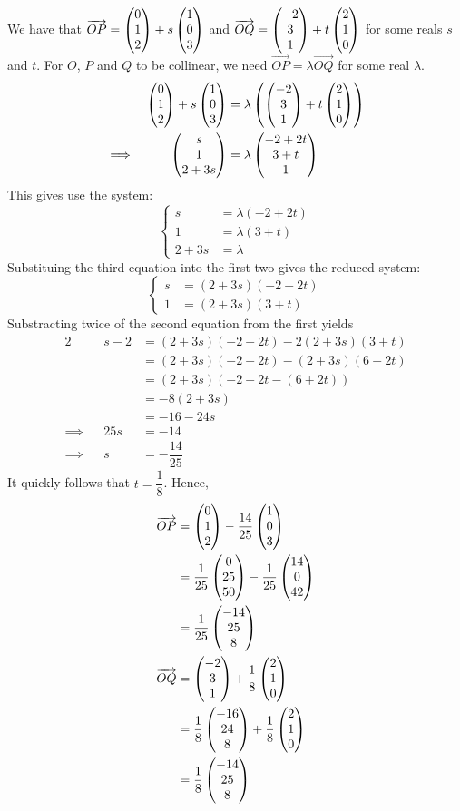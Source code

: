 \documentclass{echw}
\begin{document}
    \solution
        We have that $\overrightarrow{OP} = \begin{pmatrix} 0 \\ 1 \\ 2 \end{pmatrix} + s\begin{pmatrix} 1 \\ 0 \\ 3 \end{pmatrix}$ and $\overrightarrow{OQ} = \begin{pmatrix} -2 \\ 3 \\ 1 \end{pmatrix} + t\begin{pmatrix} 2 \\ 1 \\ 0 \end{pmatrix}$ for some reals $s$ and $t$. For $O$, $P$ and $Q$ to be collinear, we need $\overrightarrow{OP} = \lambda \overrightarrow{OQ}$ for some real $\lambda$.
        \begin{alignat*}{2}
            &&\begin{pmatrix} 0 \\ 1 \\ 2 \end{pmatrix} + s\begin{pmatrix} 1 \\ 0 \\ 3 \end{pmatrix} &= \lambda\left(\begin{pmatrix} -2 \\ 3 \\ 1 \end{pmatrix} + t\begin{pmatrix} 2 \\ 1 \\ 0 \end{pmatrix}\right)\\
            \implies&&\begin{pmatrix} s \\ 1 \\ 2 + 3s \end{pmatrix} &= \lambda\begin{pmatrix} -2+2t \\ 3+t \\ 1 \end{pmatrix}
        \end{alignat*}
        This gives use the system:
        \begin{equation*}
            \begin{cases}
                s &= \lambda (-2 + 2t)\\
                1 &= \lambda(3 + t)\\
                2 + 3s &= \lambda 
            \end{cases}
        \end{equation*}
        Substituing the third equation into the first two gives the reduced system:
        \begin{equation*}
            \begin{cases}
                s &= (2+3s)(-2+2t)\\
                1 &= (2+3s)(3+t)
            \end{cases}
        \end{equation*}
        Substracting twice of the second equation from the first yields
        \begin{alignat*}{2}
            &&s - 2 &= (2+3s)(-2+2t) - 2(2+3s)(3+t)\\
            && &= (2+3s)(-2+2t) - (2+3s)(6+2t)\\
            && &= (2+3s)(-2+2t - (6+2t))\\
            && &= -8(2+3s)\\
            && &= -16 - 24s\\
            \implies&&25s &= -14\\
            \implies&&s &= -\dfrac{14}{25}
        \end{alignat*}
        It quickly follows that $t = \dfrac18$. Hence,
        \begin{align*}
            \overrightarrow{OP} &= \begin{pmatrix} 0 \\ 1 \\ 2 \end{pmatrix} - \dfrac{14}{25}\begin{pmatrix} 1 \\ 0 \\ 3 \end{pmatrix}\\
            &= \dfrac1{25}\begin{pmatrix} 0 \\ 25 \\ 50 \end{pmatrix} - \dfrac1{25}\begin{pmatrix} 14 \\ 0 \\ 42 \end{pmatrix}\\
            &= \dfrac1{25}\begin{pmatrix} -14 \\ 25 \\ 8 \end{pmatrix}\\
            \overrightarrow{OQ} &= \begin{pmatrix} -2 \\ 3 \\ 1 \end{pmatrix} + \dfrac18\begin{pmatrix} 2 \\ 1 \\ 0 \end{pmatrix}\\
            &= \dfrac18 \begin{pmatrix} -16 \\ 24 \\ 8 \end{pmatrix} + \dfrac18 \begin{pmatrix} 2 \\ 1 \\ 0 \end{pmatrix}\\
            &= \dfrac18 \begin{pmatrix} -14 \\ 25 \\ 8 \end{pmatrix}
        \end{align*}
\end{document}
